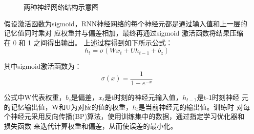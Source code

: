 \documentclass[AutoFakeBold]{LZUThesis}
\begin{document}
\begin{figure}[H]
	\centering
    \caption{两种神经网络结构示意图}
    \label{fig_nn}
\end{figure}

假设激活函数为sigmoid，RNN神经网络的每个神经元都是通过输入值和上一层的记忆值同时乘对
应权重并与偏差相加，最终再通过sigmoid 激活函数将结果压缩在 0 和 1 之间得出输出。
上述过程得到如下所示公式：
$$h_t=\sigma(Wx_t+Uh_{t-1}+b_z)$$

其中sigmoid激活函数为：
$$\sigma(x)=\frac{1}{1+e^{-x}}$$

公式中W代表权重，$b_z$是偏差，$x_t$是t时刻的神经元输入值，$h_{t-1}$是t-1时刻神经
元的记忆输出值，W和U为对应的值的权重，$h_t$是当前神经元的输出值。训练时
对每个神经元采用反向传播(BP)算法，使用训练集中的数据，通过指定学习优化器和损失函数
来迭代计算权重和偏差，从而使误差的最小化。
\end{document}
